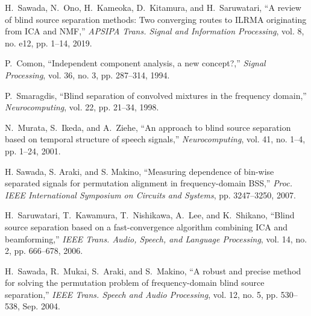 \documentclass[honka]{nitkagawathesis}%
\begin{document}






\backmatter



\begin{thebibliography}{99}
  
  H.~Sawada, N.~Ono, H.~Kameoka, D.~Kitamura, and H.~Saruwatari, ``A review of blind source separation methods: Two converging routes to ILRMA originating from ICA and NMF,'' \textit {APSIPA Trans. Signal and Information Processing}, vol. 8, no. e12, pp. 1--14, 2019.
  
  P.~Comon, ``Independent component analysis, a new concept?,'' \textit{Signal Processing}, vol. 36, no. 3, pp. 287--314, 1994.
  
  P.~Smaragdis, ``Blind separation of convolved mixtures in the frequency domain,'' \textit{Neurocomputing}, vol. 22, pp. 21--34, 1998.
  
  N.~Murata, S.~Ikeda, and A.~Ziehe, ``An approach to blind source separation based on temporal structure of speech signals,''  \textit{Neurocomputing}, vol. 41, no. 1--4, pp. 1--24, 2001.
  
  H. Sawada, S. Araki, and S. Makino, ``Measuring dependence of bin-wise separated signals for permutation alignment in frequency-domain BSS,'' \textit{Proc. IEEE International Symposium on Circuits and Systems}, pp. 3247--3250, 2007.
  
  H.~Saruwatari, T.~Kawamura, T.~Nishikawa, A.~Lee, and K.~Shikano, ``Blind source separation based on a fast-convergence algorithm combining ICA and beamforming,''  \textit{IEEE Trans. Audio, Speech, and Language Processing}, vol. 14, no. 2, pp. 666--678, 2006.
  
  H.~Sawada, R.~Mukai, S.~Araki, and S.~Makino, ``A robust and precise method for solving the permutation problem of frequency-domain blind source separation,''  \textit{IEEE Trans. Speech and Audio Processing}, vol. 12, no. 5, pp. 530--538, Sep. 2004.
  

\end{thebibliography}
\end{document}
